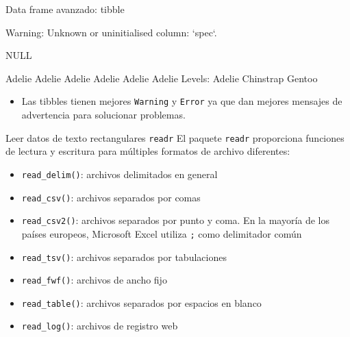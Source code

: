 \documentclass[
  ignorenonframetext,
  aspectratio=169]{beamer}
\newenvironment{Shaded}{\begin{snugshade}}{\end{snugshade}}
\newcommand{\FunctionTok}[1]{\textcolor[rgb]{0.00,0.00,0.00}{#1}}
\newcommand{\NormalTok}[1]{#1}
\newcommand{\SpecialCharTok}[1]{\textcolor[rgb]{0.00,0.00,0.00}{#1}}
\providecommand{\tightlist}{%
  \setlength{\itemsep}{0pt}\setlength{\parskip}{0pt}}
\let\oldverbatim\verbatim
\let\endoldverbatim\endverbatim
\renewenvironment{verbatim}{\tiny\oldverbatim}{\endoldverbatim}
\begin{document}
\begin{frame}[fragile]{Data frame avanzado: tibble}
\protect\hypertarget{data-frame-avanzado-tibble-10}{}
\begin{Shaded}
\end{Shaded}

\begin{verbatim}
Warning: Unknown or uninitialised column: `spec`.
\end{verbatim}

\begin{verbatim}
NULL
\end{verbatim}

\begin{Shaded}
\end{Shaded}

\begin{verbatim}
[1] Adelie Adelie Adelie Adelie Adelie Adelie
Levels: Adelie Chinstrap Gentoo
\end{verbatim}

\begin{itemize}
\tightlist
\item
  Las tibbles tienen mejores \texttt{Warning} y \texttt{Error} ya que
  dan mejores mensajes de advertencia para solucionar problemas.
\end{itemize}
\end{frame}

\begin{frame}[fragile]{Leer datos de texto rectangulares \texttt{readr}}
\protect\hypertarget{leer-datos-de-texto-rectangulares-readr}{}
El paquete \texttt{readr} proporciona funciones de lectura y escritura
para múltiples formatos de archivo diferentes:

\begin{itemize}
\item
  \texttt{read\_delim()}: archivos delimitados en general
\item
  \texttt{read\_csv()}: archivos separados por comas
\item
  \texttt{read\_csv2()}: archivos separados por punto y coma. En la
  mayoría de los países europeos, Microsoft Excel utiliza \texttt{;}
  como delimitador común
\item
  \texttt{read\_tsv()}: archivos separados por tabulaciones
\item
  \texttt{read\_fwf()}: archivos de ancho fijo
\item
  \texttt{read\_table()}: archivos separados por espacios en blanco
\item
  \texttt{read\_log()}: archivos de registro web
\end{itemize}
\end{frame}
\end{document}
